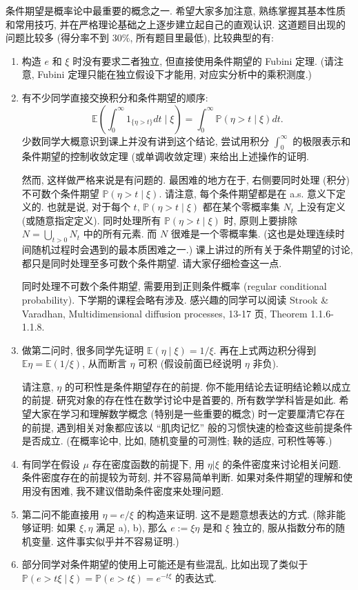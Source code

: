 \begin{enumerate}
\begin{proofc}[证明]
        条件期望是概率论中最重要的概念之一. 希望大家多加注意, 熟练掌握其基本性质和常用技巧, 并在严格理论基础之上逐步建立起自己的直观认识. 这道题目出现的问题比较多 (得分率不到 30\%, 所有题目里最低), 比较典型的有: 
        \begin{enumerate}[label=(\arabic*)] 
            \item 构造 $e$ 和 $\xi$ 时没有要求二者独立, 但直接使用条件期望的 Fubini 定理. (请注意, Fubini 定理只能在独立假设下才能用, 对应实分析中的乘积测度.) 
            \item 有不少同学直接交换积分和条件期望的顺序: \[ \mathbb E\left(\int_0^\infty 1_{\{\eta>t\}}dt\mid \xi\right) =\int_0^\infty \mathbb P(\eta>t\mid \xi)dt. \] 
            少数同学大概意识到课上并没有讲到这个结论, 尝试用积分 $\int_0^\infty$ 的极限表示和条件期望的控制收敛定理 (或单调收敛定理) 来给出上述操作的证明. 
            
            然而, 这样做严格来说是有问题的. 最困难的地方在于, 右侧要同时处理 (积分) 不可数个条件期望 $\mathbb P(\eta>t\mid\xi)$. 请注意, 每个条件期望都是在 a.s. 意义下定义的. 也就是说, 对于每个 $t$, $\mathbb P(\eta>t\mid\xi)$ 都在某个零概率集 $N_t$ 上没有定义 (或随意指定定义). 同时处理所有 $\mathbb P(\eta>t\mid\xi)$ 时, 原则上要排除 $N=\bigcup_{t>0}N_t$ 中的所有元素. 而 $N$ 很难是一个零概率集. (这也是处理连续时间随机过程时会遇到的最本质困难之一.) 课上讲过的所有关于条件期望的讨论, 都只是同时处理至多可数个条件期望. 请大家仔细检查这一点. 
            
            同时处理不可数个条件期望, 需要用到正则条件概率 (regular conditional probability). 下学期的课程会略有涉及. 感兴趣的同学可以阅读 Strook \& Varadhan, Multidimensional diffusion processes, 13-17 页, Theorem 1.1.6-1.1.8. 
            
            \item 做第二问时, 很多同学先证明 $\mathbb E(\eta\mid\xi)=1/\xi$. 再在上式两边积分得到 $\mathbb E\eta=\mathbb E(1/\xi)$, 从而断言 $\eta$ 可积 (假设前面已经说明 $\eta$ 非负). 
            
            请注意, $\eta$ 的可积性是条件期望存在的前提. 你不能用结论去证明结论赖以成立的前提. 研究对象的存在性在数学讨论中是首要的, 所有数学学科皆是如此. 希望大家在学习和理解数学概念 (特别是一些重要的概念) 时一定要厘清它存在的前提, 遇到相关对象都应该以 “肌肉记忆” 般的习惯快速的检查这些前提条件是否成立. (在概率论中, 比如, 随机变量的可测性; 鞅的适应, 可积性等等.) 
            \item 有同学在假设 $\mu$ 存在密度函数的前提下, 用 $\eta|\xi$ 的条件密度来讨论相关问题. 条件密度存在的前提较为苛刻, 并不容易简单判断. 如果对条件期望的理解和使用没有困难, 我不建议借助条件密度来处理问题. 
            \item 第二问不能直接用 $\eta=e/\xi$ 的构造来证明. 这不是题意想表达的方式. (除非能够证明: 如果 $\xi,\eta$ 满足 a), b), 那么 $e:=\xi\eta$ 是和 $\xi$ 独立的, 服从指数分布的随机变量. 这件事实似乎并不容易证明.) 
            \item 部分同学对条件期望的使用上可能还是有些混乱, 比如出现了类似于 $\mathbb P(e>t\xi\mid\xi)=\mathbb P(e>t\xi)=e^{-t\xi}$ 的表达式. 
        \end{enumerate}
    \end{proofc}


\end{enumerate}
